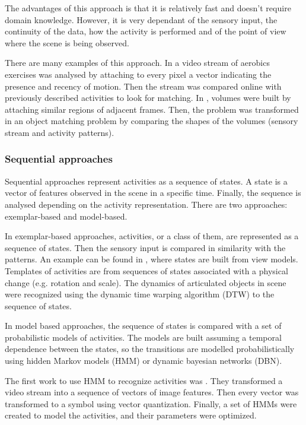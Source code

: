 The advantages of this approach is that it is relatively fast and doesn't require domain knowledge. 
However, it is very dependant of the sensory input, the continuity of the data, how the activity is performed and of the point of view where the scene is being observed. %

There are many examples of this approach.
In \citep{Bobick2001_RecHuMovTemp} a video stream of aerobics exercises was analysed by attaching to every pixel a vector indicating the presence and recency of motion. 
Then the stream was compared online with previously described activities to look for matching. 
In \citep{Ke2007_SpTmpShapeAR}, volumes were built by attaching similar regions of adjacent frames.
Then, the problem was transformed in an object matching problem by comparing the shapes of the volumes (sensory stream and activity patterns).

\subsubsection{Sequential approaches} %

Sequential approaches represent activities as a sequence of states. 
A state is a vector of features observed in the scene in a specific time.
Finally, the sequence is analysed depending on the activity representation.
There are two approaches: exemplar-based and model-based.

In exemplar-based approaches, activities, or a class of them, are represented as a sequence of states. 
Then the sensory input is compared in similarity with the patterns.
An example can be found in \citep{Darrell1993_STGestures}, where states are built from view models.
Templates of activities are from sequences of states associated with a physical change (e.g. rotation and scale).
The dynamics of articulated objects in scene were recognized using the dynamic time warping algorithm (DTW) to the sequence of states.

In model based approaches, the sequence of states is compared with a set of probabilistic models of activities. The models are built assuming a temporal dependence between the states, so the transitions are modelled probabilistically using hidden Markov models (HMM) or dynamic bayesian networks (DBN).

The first work to use HMM to recognize activities was \citep{Yamato1992_RecHA_HMM}. They transformed a video stream into a sequence of vectors of image features. Then every vector was transformed to a symbol using vector quantization. Finally, a set of HMMs were created to model the activities, and their parameters were optimized. 


